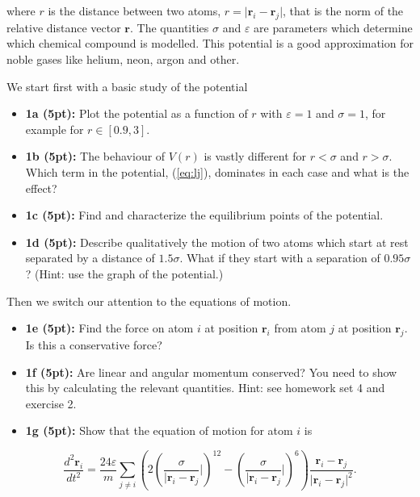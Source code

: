 \documentclass[%
oneside,                 %
final,                   %
10pt]{article}
\begin{document}
where $r$ is the distance between two atoms,
$r=\vert\bm{r}_i-\bm{r}_j\vert$, that is the norm of the relative
distance vector $\bm{r}$. The quantities $\sigma$ and $\varepsilon$ are
parameters which determine which chemical compound is modelled. This
potential is a good approximation for noble gases like helium, neon, argon and other.

We start first with a basic study of the potential

\begin{itemize}
\item \textbf{1a (5pt):} Plot the potential as a function of $r$ with $\varepsilon=1$ and $\sigma=1$, for example for $r \in [0.9,3]$.

\item \textbf{1b (5pt):} The behaviour of $V(r)$ is vastly different for $r < \sigma$ and $r > \sigma$. Which term in the potential, (\ref{eq:lj}), dominates in each case and what is the effect?

\item \textbf{1c (5pt):} Find and characterize the equilibrium points of the potential.

\item \textbf{1d (5pt):} Describe qualitatively the motion of two atoms which start at rest separated by a distance of ${1.5}\sigma$. What if they start with a separation of ${0.95}\sigma$?  (Hint: use the graph of the potential.)
\end{itemize}

\noindent
Then we switch our attention to the equations of motion.

\begin{itemize}
\item \textbf{1e (5pt):} Find the force on atom $i$ at position $\bm{r}_i$ from atom $j$ at position $\bm{r}_j$. Is this a conservative force?

\item \textbf{1f (5pt):}  Are linear and angular momentum conserved? You need to show this by calculating the relevant quantities. Hint: see homework set 4 and exercise 2.

\item \textbf{1g (5pt):} Show that the equation of motion for atom $i$ is
\end{itemize}

\noindent
\[
  \frac{d^2\bm{r}_i}{dt^2} = \frac{24\varepsilon}{m} \sum_{j \neq i} \left(2(\frac{\sigma}{\vert\bm{r}_i-\bm{r}_j}\vert)^{12}-(\frac{\sigma}{\vert\bm{r}_i-\bm{r}_j}\vert)^6\right)\frac{\bm{r}_i-\bm{r}_j}{\vert\bm{r}_i-\bm{r}_j\vert^2}.
\]
\end{document}
